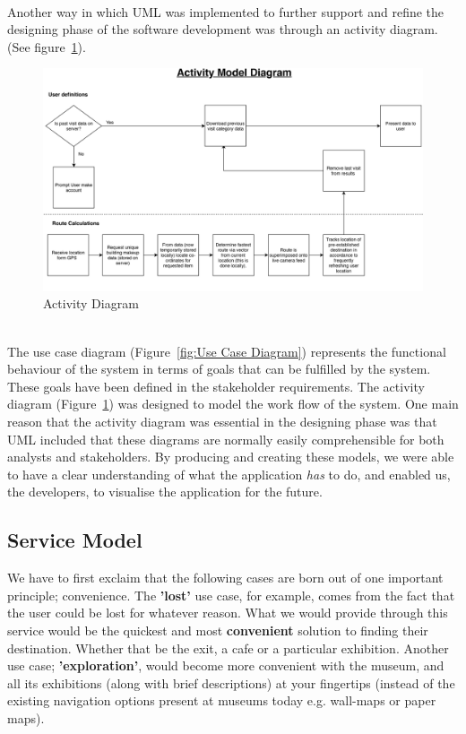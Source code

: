 \documentclass{article}
\begin{document}
\\Another way in which UML was implemented to further support and refine the designing phase of the software development was through an activity diagram. (See figure~\ref{fig:Activity Diagram}).

\begin{figure}[H]
    \centering
    \includegraphics[width=\textwidth]{Activity_Diagram.pdf}
    \caption{Activity Diagram}
    \label{fig:Activity Diagram}
\end{figure}

\\The use case diagram (Figure~\ref{fig:Use Case Diagram}) represents the functional behaviour of the system in terms of goals that can be fulfilled by the system. These goals have been defined in the stakeholder requirements. The activity diagram (Figure~\ref{fig:Activity Diagram}) was designed to model the work flow of the system. One main reason that the activity diagram was essential in the designing phase was that UML included that these diagrams are normally easily comprehensible for both analysts and stakeholders. By producing and creating these models, we were able to have a clear understanding of what the application \textit{has} to do, and enabled us, the developers, to visualise the application for the future.

\subsection{Service Model}

We have to first exclaim that the following cases are born out of one important principle; convenience. The \textbf{'lost'} use case, for example, comes from the fact that the user could be lost for whatever reason. What we would provide through this service would be the quickest and most \textbf{convenient} solution to finding their destination. Whether that be the exit, a cafe or a particular exhibition. Another use case;
\textbf{'exploration'}, would become more convenient with the museum, and all its exhibitions (along with brief descriptions) at your fingertips (instead of the existing navigation options present at museums today e.g. wall-maps or paper maps).
\end{document}
